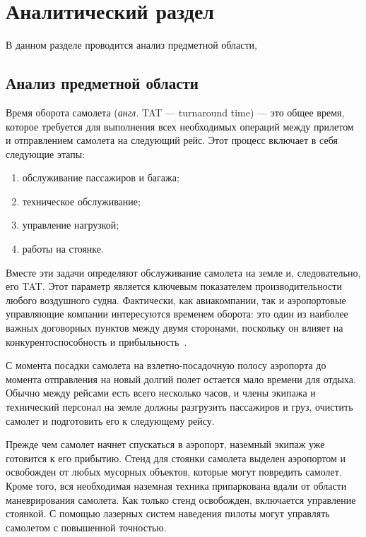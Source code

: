 \chapter{Аналитический раздел}

В данном разделе проводится анализ предметной области,


\section{Анализ предметной области}

Время оборота самолета (\textit{англ.} TAT --- turnaround time) --- это общее время, которое требуется для выполнения всех необходимых операций между прилетом и отправлением самолета на следующий рейс.
Этот процесс включает в себя следующие этапы:
\begin{enumerate}[label=\arabic*)]
    \item обслуживание пассажиров и багажа;
    \item техническое обслуживание;
    \item управление нагрузкой;
    \item работы на стоянке.
\end{enumerate}

Вместе эти задачи определяют обслуживание самолета на земле и, следовательно, его TAT\@.
Этот параметр является ключевым показателем производительности любого воздушного судна.
Фактически, как авиакомпании, так и аэропортовые управляющие компании интересуются временем оборота: это один из наиболее важных договорных пунктов между двумя сторонами, поскольку он влияет на конкурентоспособность и прибыльность~\cite{trt-timeestimation}.

С момента посадки самолета на взлетно-посадочную полосу аэропорта до момента отправления на новый долгий полет остается мало времени для отдыха.
Обычно между рейсами есть всего несколько часов, и члены экипажа и технический персонал на земле должны разгрузить пассажиров и груз, очистить самолет и подготовить его к следующему рейсу.

Прежде чем самолет начнет спускаться в аэропорт, наземный экипаж уже готовится к его прибытию.
Стенд для стоянки самолета выделен аэропортом и освобожден от любых мусорных объектов, которые могут повредить самолет.
Кроме того, вся необходимая наземная техника припаркована вдали от области маневрирования самолета.
Как только стенд освобожден, включается управление стоянкой.
С помощью лазерных систем наведения пилоты могут управлять самолетом с повышенной точностью.

